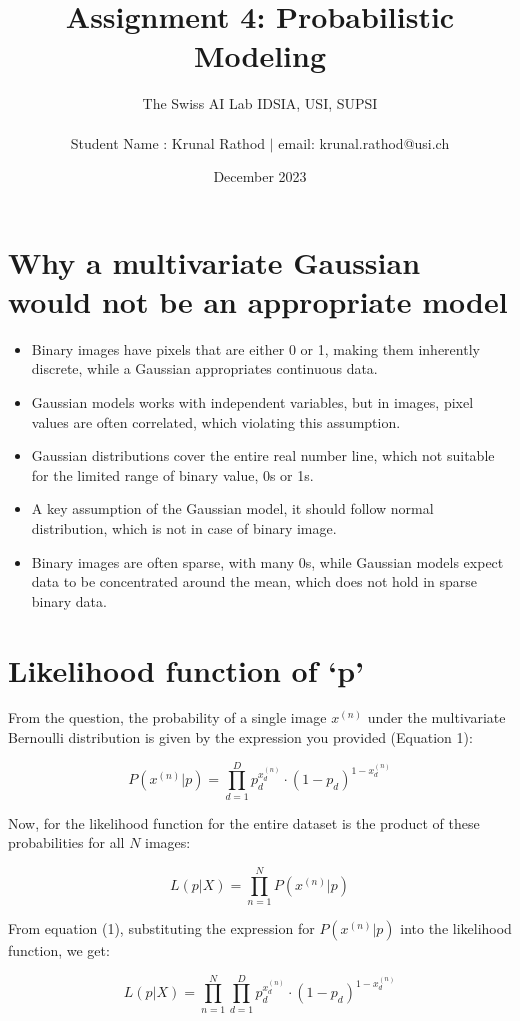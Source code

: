 \documentclass{article}
\title{ Assignment 4: Probabilistic Modeling}
\author{The Swiss AI Lab IDSIA, USI, SUPSI \\ \\ Student Name : Krunal Rathod $|$ email: krunal.rathod@usi.ch}
\date{December 2023}
\begin{document}
\maketitle

\section{Why a multivariate Gaussian would not be an appropriate model}

\begin{itemize}
    \item Binary images have pixels that are either 0 or 1, making them inherently discrete, while a Gaussian appropriates continuous data.
    \item Gaussian models works with independent variables, but in images, pixel values are often correlated, which violating this assumption.
    \item Gaussian distributions cover the entire real number line, which not suitable for the limited range of binary value, 0s or 1s.
    \item A key assumption of the Gaussian model, it should follow normal distribution, which is not in case of binary image.
    \item Binary images are often sparse, with many 0s, while Gaussian models expect data to be concentrated around the mean, which does not hold in sparse binary data.
\end{itemize}

\section{Likelihood function of `p'}

From the question, the probability of a single image \( x^{(n)} \) under the multivariate Bernoulli distribution is given by the expression you provided (Equation 1):

\[ P(x^{(n)} | p) = \prod_{d=1}^{D} p_d^{x_d^{(n)}} \cdot (1 - p_d)^{1 - x_d^{(n)}} \]

Now, for the likelihood function for the entire dataset is the product of these probabilities for all \( N \) images:

\[ L(p | X) = \prod_{n=1}^{N} P(x^{(n)} | p) \]

From equation (1), substituting the expression for \( P(x^{(n)} | p) \) into the likelihood function, we get:

\[ L(p | X) = \prod_{n=1}^{N} \prod_{d=1}^{D} p_d^{x_d^{(n)}} \cdot (1 - p_d)^{1 - x_d^{(n)}} \]
\end{document}
